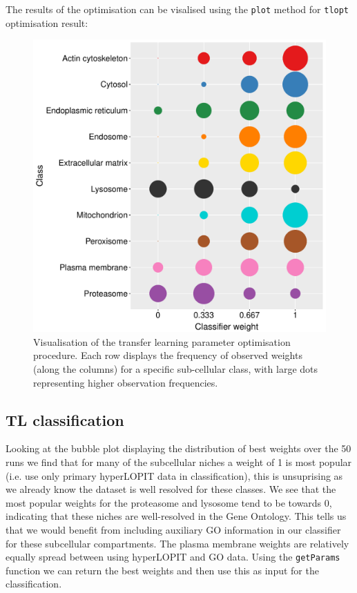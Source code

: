 The results of the optimisation can be visalised using the
\texttt{plot} method for \texttt{tlopt} optimisation result:



\begin{figure}[!ht]
  \centering
\begin{knitrout}
\color{fgcolor}\begin{kframe}
\begin{alltt}
\end{alltt}
\end{kframe}
\includegraphics[width=.6\textwidth]{figure/plottl-1} 

\end{knitrout}
\caption{Visualisation of the transfer learning parameter optimisation
  procedure. Each row displays the frequency of observed weights
  (along the columns) for a specific sub-cellular class, with large
  dots representing higher observation frequencies.}
  \label{fig:plottl}
\end{figure}


\subsection*{TL classification}

Looking at the bubble plot displaying the distribution of best weights
over the 50 runs we find that for many of the subcellular niches a
weight of 1 is most popular (i.e. use only primary hyperLOPIT data in
classification), this is unsuprising as we already know the dataset is
well resolved for these classes. We see that the most popular weights
for the proteasome and lysosome tend to be towards 0, indicating that
these niches are well-resolved in the Gene Ontology. This tells us
that we would benefit from including auxiliary GO information in our
classifier for these subcellular compartments. The plasma membrane
weights are relatively equally spread between using hyperLOPIT and GO
data. Using the \texttt{getParams} function we can return the best
weights and then use this as input for the classification.

